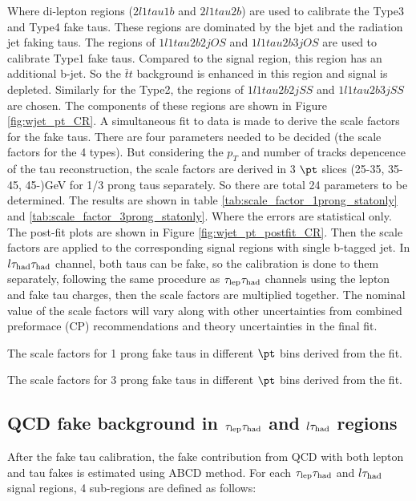 Where di-lepton regions ($2l1tau1b$ and $2l1tau2b$) are used to calibrate the Type3 and Type4 fake taus. These regions are dominated by the bjet and the radiation jet faking taus. The regions of $1l1tau2b2j OS$ and $1l1tau2b3j OS$ are used to calibrate Type1 fake taus. Compared to the signal region, this region has an additional b-jet. So the $\bar{t}t$ background is enhanced in this region and signal is depleted. Similarly for the Type2, the regions of $1l1tau2b2j SS$ and $1l1tau2b3j SS$ are chosen. The components of these regions are shown in Figure \ref{fig:wjet_pt_CR}. A simultaneous fit to data is made to derive the scale factors for the fake taus. There are four parameters needed to be decided (the scale factors for the 4 types). But considering the $p_{T}$ and number of tracks depencence of the tau reconstruction, the scale factors are derived in 3 $\pt$ slices (25-35, 35-45, 45-)GeV for 1/3 prong taus separately. So there are total 24 parameters to be determined. The results are shown in table \ref{tab:scale_factor_1prong_statonly} and \ref{tab:scale_factor_3prong_statonly}. Where the errors are statistical only. The post-fit plots are shown in Figure \ref{fig:wjet_pt_postfit_CR}. Then the scale factors are applied to the corresponding signal regions with single b-tagged jet. In $l\tau_\text{had}{}\tau_\text{had}$ channel, both taus can be fake, so the calibration is done to them separately, following the same procedure as $\tau_\text{lep}{}\tau_\text{had}$ channels using the lepton and fake tau charges, then the scale factors are multiplied together. The nominal value of the scale factors will vary along with other uncertainties from combined preformace (CP) recommendations and theory uncertainties in the final fit.

\begin{table}
\caption{The scale factors for 1 prong fake taus in different $\pt$ bins derived from the fit.}
\label{tab:scale_factor_1prong_statonly}

\end{table}
\begin{table}
\caption{The scale factors for 3 prong fake taus in different $\pt$ bins derived from the fit.}
\label{tab:scale_factor_3prong_statonly}

\end{table}




\subsection{QCD fake background in $\tau_\text{lep}{}\tau_\text{had}$ and $l\tau_\text{had}$ regions}
\label{sec:ABCD}
After the fake tau calibration, the fake contribution from QCD with both lepton and tau fakes is estimated using ABCD method. For each $\tau_\text{lep}{}\tau_\text{had}$ and $l\tau_\text{had}$ signal regions, 4 sub-regions are defined as follows:

